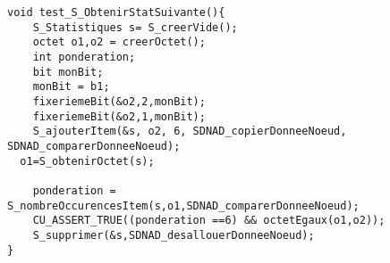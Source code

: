 \begin{verbatim}
void test_S_ObtenirStatSuivante(){
	S_Statistiques s= S_creerVide();
	octet o1,o2 = creerOctet();
	int ponderation;
	bit monBit;
	monBit = b1;
	fixeriemeBit(&o2,2,monBit);
	fixeriemeBit(&o2,1,monBit);
	S_ajouterItem(&s, o2, 6, SDNAD_copierDonneeNoeud, SDNAD_comparerDonneeNoeud);
  o1=S_obtenirOctet(s);

	ponderation = S_nombreOccurencesItem(s,o1,SDNAD_comparerDonneeNoeud);
	CU_ASSERT_TRUE((ponderation ==6) && octetEgaux(o1,o2));
	S_supprimer(&s,SDNAD_desallouerDonneeNoeud);
}
\end{verbatim}
 

